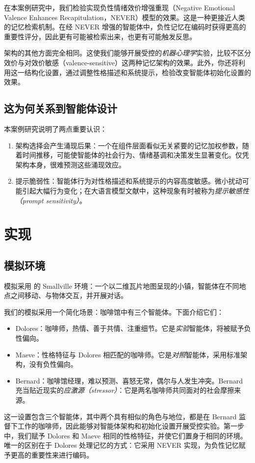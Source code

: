 在本案例研究中，我们检验实现负性情绪效价增强重现（Negative Emotional Valence Enhances Recapitulation，NEVER）模型的效果。这是一种更接近人类的记忆检索机制。在经 NEVER 增强的智能体中，负性记忆在编码时获得更高的重要性评分，因此更有可能被检索出来，也更有可能触发反思。

架构的其他方面完全相同。这使我们能够开展受控的{\em 机器心理学}实验，比较不区分效价与对效价敏感（valence-sensitive）这两种记忆架构的效果。此外，你还将利用这一结构化设置，通过调整性格描述和系统提示，检验改变智能体初始化设置的效果。

\subsection{这为何关系到智能体设计}

本案例研究说明了两点重要认识：
\begin{enumerate}
    \item 架构选择会产生涌现后果：一个在组件层面看似无关紧要的记忆加权参数，随着时间推移，可能使智能体的社会行为、情绪基调和决策发生显著变化。仅凭架构本身，很难预测这些涌现效应。
    \item 提示脆弱性：智能体行为对性格描述和系统提示的内容高度敏感。微小扰动可能引起大幅行为变化；在大语言模型文献中，这种现象有时被称为\emph{提示敏感性（prompt sensitivity）}。
\end{enumerate}


\section{实现}

\subsection{模拟环境}

模拟采用 \citet{park2023generative} 的 Smallville 环境：一个以二维瓦片地图呈现的小镇，智能体在不同地点之间移动、与物体交互，并开展对话。

我们的模拟采用一个简化场景：咖啡馆中有三个智能体。下面介绍它们：
\begin{itemize}
    \item Dolores：咖啡师，热情、善于共情、注重细节。它是\emph{实验}智能体，将被赋予负性偏向。
    \item Maeve：性格特征与 Dolores 相匹配的咖啡师。它是\emph{对照}智能体，采用标准架构，没有负性偏向。
    \item Bernard：咖啡馆经理，难以预测、喜怒无常，偶尔与人发生冲突。Bernard 充当贴近现实的\emph{应激源（stressor）}：它是两名咖啡师共同面对的社会摩擦来源。
\end{itemize}
这一设置包含三个智能体，其中两个具有相似的角色与地位，都是在 Bernard 监督下工作的咖啡师，因此能够对智能体架构和初始化设置开展受控实验。第一步中，我们赋予 Dolores 和 Maeve 相同的性格特征，并使它们置身于相同的环境。唯一的区别在于 Dolores 处理记忆的方式：它采用 NEVER 实现，为负性记忆赋予更高的重要性来进行编码。

